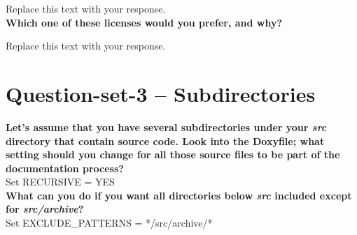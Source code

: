 \documentclass{article}
\begin{document}
Replace this text with your response. \\

\textbf{Which one of these licenses would you prefer, and why?}

Replace this text with your response. \\

\section{Question-set-3 -- Subdirectories}
\textbf{Let's assume that you have several subdirectories under your \textit{src} directory that contain source code. Look into the Doxyfile; what setting should you change for all those source files to be part of the documentation process?}\\

Set RECURSIVE = YES \\

\textbf{What can you do if you want all directories below \textit{src} included except for \textit{src/archive}?}\\

Set EXCLUDE\_PATTERNS = */src/archive/* \\
\end{document}
